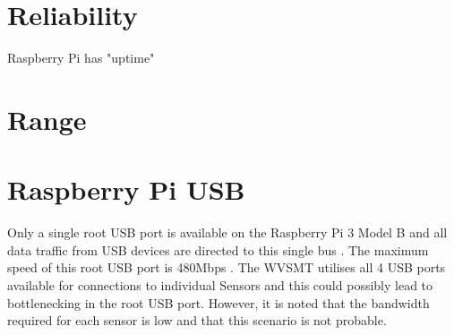\section{Reliability}
Raspberry Pi has "uptime"

\section{Range}


\section{Raspberry Pi USB}

Only a single root USB port is available on the Raspberry Pi 3 Model B and all data traffic from USB devices are directed to this single bus \cite{rpi3hardware}. The maximum speed of this root USB port is 480Mbps \cite{rpi3faqs}. The WVSMT utilises all 4 USB ports available for connections to individual Sensors and this could possibly lead to bottlenecking in the root USB port. However, it is noted that the bandwidth required for each sensor is low and that this scenario is not probable. 